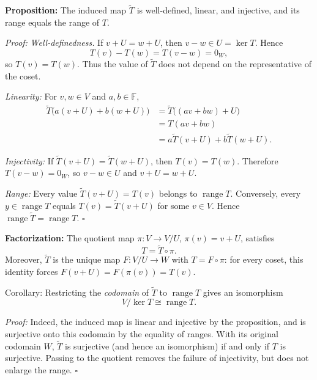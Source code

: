 \documentclass[a4paper,11pt,abstract=true]{scrartcl}
\theoremstyle{dotlessP}
\theoremstyle{dotlessS}
\theoremstyle{remark}
\theoremstyle{definition}
\begin{document}
\begin{claim_box}
\textbf{Proposition:} The induced map $\widetilde{T}$ is
well-defined, linear, and injective, and its range equals the range of $T$.

\textit{Proof:} \emph{Well-definedness.} If $v+U=w+U$, then $v-w\in U=\ker T$.
Hence
\[
T(v)-T(w)=T(v-w)=0_W,
\]
so $T(v)=T(w)$. Thus the value of $\widetilde{T}$ does not depend on
the representative of the coset.

\emph{Linearity:} For $v,w\in V$ and $a,b\in\mathbb{F}$,
\[
\begin{aligned}
\widetilde{T}\bigl(a(v+U)+b(w+U)\bigr)
&=\widetilde{T}\bigl((av+bw)+U\bigr)\\
&=T(av+bw)\\
&=a\widetilde{T}(v+U)+b\widetilde{T}(w+U).
\end{aligned}
\]

\emph{Injectivity:} If $\widetilde{T}(v+U)=\widetilde{T}(w+U)$,
then $T(v)=T(w)$. Therefore $T(v-w)=0_W$, so $v-w\in U$ and
$v+U=w+U$.

\emph{Range:} Every value $\widetilde{T}(v+U)=T(v)$ belongs to
$\operatorname{range}T$. Conversely, every $y\in\operatorname{range}T$
equals $T(v)=\widetilde{T}(v+U)$ for some $v\in V$. Hence
$\operatorname{range}\widetilde{T}=\operatorname{range}T$.
\hfill$\square$
\end{claim_box}

\begin{claim_box}
\textbf{Factorization:} The quotient map
$\pi:V\longrightarrow V/U$, $\pi(v)=v+U$, satisfies
\[
T=\widetilde{T}\circ\pi.
\]
Moreover, $\widetilde{T}$ is the unique map $F:V/U\longrightarrow W$
with $T=F\circ\pi$: for every coset, this identity forces
$F(v+U)=F(\pi(v))=T(v)$.
\end{claim_box}

\begin{mainbox}{Corollary:}
Restricting the
\emph{codomain} of $\widetilde{T}$ to $\operatorname{range}T$ gives an
isomorphism
\[
V/\ker T\cong\operatorname{range}T.
\]
\end{mainbox}

\begin{claim_box}
\textit{Proof:} Indeed, the induced map is linear and injective by the
proposition,
and is surjective onto this codomain by the equality of ranges.
With its original codomain $W$, $\widetilde{T}$ is surjective (and hence
an isomorphism) if and only if $T$ is surjective. Passing to the quotient
removes the failure of injectivity, but does not enlarge the range.
\hfill$\square$
\end{claim_box}
\end{document}
